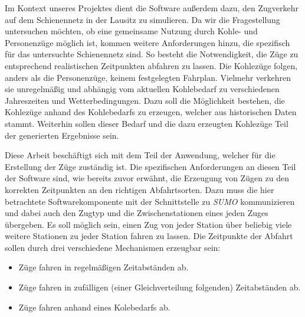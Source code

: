 Im Kontext unseres Projektes dient die Software außerdem dazu, den Zugverkehr auf dem Schienennetz in der Lausitz zu simulieren. Da wir die Fragestellung untersuchen möchten, ob eine gemeinsame Nutzung durch Kohle- und Personenzüge möglich ist, kommen weitere Anforderungen hinzu, die spezifisch für das untersuchte Schienennetz sind. So besteht die Notwendigkeit, die Züge zu entsprechend realistischen Zeitpunkten abfahren zu lassen. Die Kohlezüge folgen, anders als die Personenzüge, keinem festgelegten Fahrplan. Vielmehr verkehren sie unregelmäßig und abhängig vom aktuellen Kohlebedarf zu verschiedenen Jahreszeiten und Wetterbedingungen. Dazu soll die Möglichkeit bestehen, die Kohlezüge anhand des Kohlebedarfs zu erzeugen, welcher aus historischen Daten stammt. Weiterhin sollen dieser Bedarf und die dazu erzeugten Kohlezüge Teil der generierten Ergebnisse sein.

Diese Arbeit beschäftigt sich mit dem Teil der Anwendung, welcher für die Erstellung der Züge zuständig ist. Die spezifischen Anforderungen an diesen Teil der Software sind, wie bereits zuvor erwähnt, die Erzeugung von Zügen zu den korrekten Zeitpunkten an den richtigen Abfahrtsorten. Dazu muss die hier betrachtete Softwarekomponente mit der Schnittstelle zu \emph{SUMO} kommunizieren und dabei auch den Zugtyp und die Zwischenstationen eines jeden Zuges übergeben. Es soll möglich sein, einen Zug von jeder Station über beliebig viele weitere Stationen zu jeder Station fahren zu lassen. Die Zeitpunkte der Abfahrt sollen durch drei verschiedene Mechanismen erzeugbar sein:
\begin{itemize}
    \item Züge fahren in regelmäßigen Zeitabständen ab.
    \item Züge fahren in zufälligen (einer Gleichverteilung folgenden) Zeitabständen ab.
    \item Züge fahren anhand eines Kolebedarfs ab.
\end{itemize}
